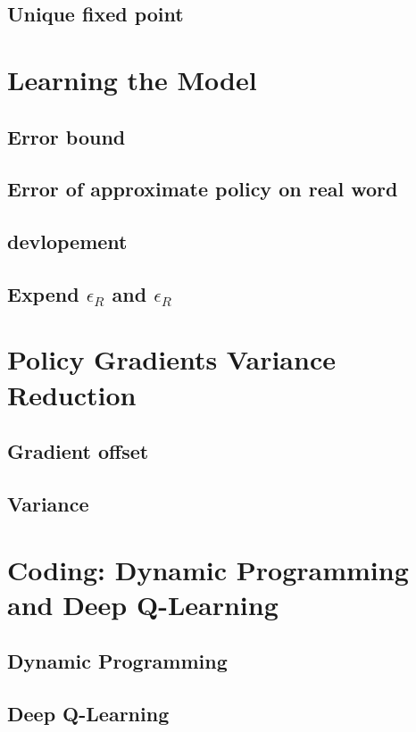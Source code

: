 \documentclass[11pt,english]{article}
\begin{document}
    \pagebreak
    \subsection{Unique fixed point}
    

    \pagebreak
    \section{Learning the Model}
    \subsection{Error bound}
    

    \pagebreak
    \subsection{Error of approximate policy on real word}
    

    \pagebreak
    \subsection{devlopement}
    

    \pagebreak
    \subsection{Expend $\epsilon_R$ and $\epsilon_R$}
    

    \pagebreak
    \section{Policy Gradients Variance Reduction}
    \subsection{Gradient offset}
    

    \pagebreak
    \subsection{Variance}
    

    \pagebreak
    \section{Coding: Dynamic Programming and Deep Q-Learning}
    \subsection{Dynamic Programming}
    

    \pagebreak
    \subsection{Deep Q-Learning}
    
\end{document}
